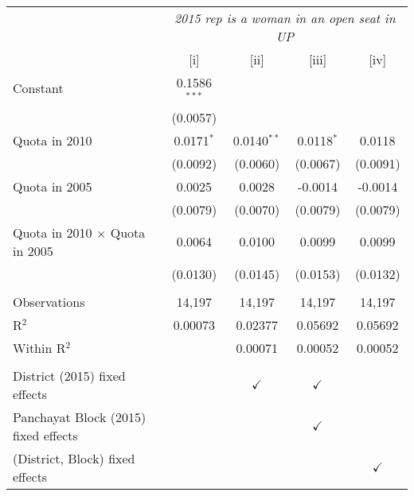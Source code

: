 
\begingroup
\centering
\begin{tabular}{lcccc}
   \toprule
    & \multicolumn{4}{c}{\textit{2015 rep is a woman in an open seat in UP}}\\
                                         & [i]            & [ii]          & [iii]         & [iv]\\  
   \midrule 
   Constant                              & 0.1586$^{***}$ &               &               &   \\   
                                         & (0.0057)       &               &               &   \\   
   Quota in 2010                         & 0.0171$^{*}$   & 0.0140$^{**}$ & 0.0118$^{*}$  & 0.0118\\   
                                         & (0.0092)       & (0.0060)      & (0.0067)      & (0.0091)\\   
   Quota in 2005                         & 0.0025         & 0.0028        & -0.0014       & -0.0014\\   
                                         & (0.0079)       & (0.0070)      & (0.0079)      & (0.0079)\\   
   Quota in 2010 $\times$ Quota in 2005  & 0.0064         & 0.0100        & 0.0099        & 0.0099\\   
                                         & (0.0130)       & (0.0145)      & (0.0153)      & (0.0132)\\   
    \\
   Observations                          & 14,197         & 14,197        & 14,197        & 14,197\\  
   R$^2$                                 & 0.00073        & 0.02377       & 0.05692       & 0.05692\\  
   Within R$^2$                          &                & 0.00071       & 0.00052       & 0.00052\\  
    \\
   District (2015) fixed effects         &                & $\checkmark$  & $\checkmark$  & \\  
   Panchayat Block (2015) fixed effects  &                &               & $\checkmark$  & \\  
   (District, Block) fixed effects       &                &               &               & $\checkmark$\\   
   \bottomrule
\end{tabular}
\par\endgroup


